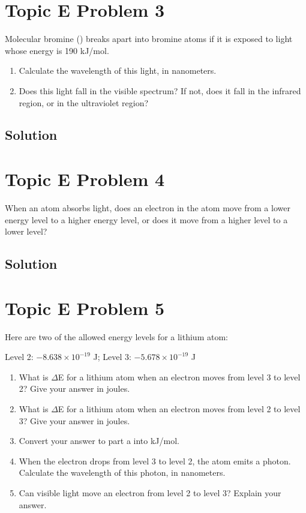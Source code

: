 \documentclass[10pt]{article}
\newcommand{\E}[1]{\times 10^{#1}}
\begin{document}
    \pagebreak
    \section{Topic E Problem 3}
        Molecular bromine () breaks apart into bromine atoms if it is exposed to light whose energy is 190 kJ/mol.
        \begin{enumerate}[label=\alph*)]
            \item   Calculate the wavelength of this light, in nanometers.
            \item   Does this light fall in the visible spectrum? 
                If not, does it fall in the infrared region, or in the ultraviolet region?
        \end{enumerate}

        \subsection{Solution}


    \pagebreak
    \section{Topic E Problem 4}
        When an atom absorbs light, does an electron in the atom move from a lower energy level to a higher energy level, or does it move from a higher level to a lower level?

        \subsection{Solution}


    \pagebreak
    \section{Topic E Problem 5}
        Here are two of the allowed energy levels for a lithium atom:
        \begin{center}
            Level 2: $-8.638\E{-19}$ J; Level 3: $-5.678\E{-19}$ J
        \end{center}
        \begin{enumerate}
            \item   What is $\Delta$E for a lithium atom when an electron moves from level 3 to level 2? 
                Give your answer in joules.
            \item   What is $\Delta$E for a lithium atom when an electron moves from level 2 to level 3? 
                Give your answer in joules.
            \item   Convert your answer to part a into kJ/mol.
            \item   When the electron drops from level 3 to level 2, the atom emits a photon. 
                Calculate the wavelength of this photon, in nanometers.
            \item   Can visible light move an electron from level 2 to level 3? 
                Explain your answer.
        \end{enumerate}
\end{document}

